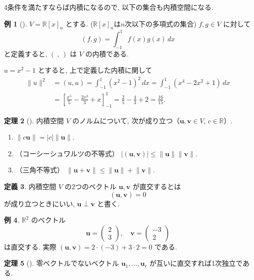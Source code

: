 \documentclass[dvipdfmx,a4paper,11pt]{article} %
\theoremstyle{definition}
\newtheorem{thm}{定理}[section]
\newtheorem{defn}[thm]{定義}
\newtheorem{eg}[thm]{例}
\newtheorem{ex}[thm]{例}
\begin{document}
4条件を満たすならば内積になるので, 以下の集合も内積空間になる. 
\begin{eg}
[{\cite[例題6.1.2]{M}}]
$V=\mathbb{R}[x]_n$ とする. ($\mathbb{R}[x]_n$は$n$次以下の多項式の集合)
$f,g\in V$ に対して
\[
(f,g)=\int_{-1}^{1}f(x)g(x)\,dx
\]
と定義すると, $(\ ,\ )$ は $V$ の内積である.

\(
u=
x^2 -1
\)
とすると, 上で定義した内積に関して
\begin{align*}
\lVert u\rVert^2
&=(u,u)
=\int_{-1}^{1}(x^2-1)^2\,dx
=\int_{-1}^{1}(x^4-2x^2+1)\,dx
\\
&=\left[
\frac{x^5}{5}-\frac{2x^3}{3}+x
\right]_{-1}^{1}
=\frac{2}{5}-\frac{4}{3}+2=\frac{16}{15}.
\end{align*}
\end{eg}




\begin{thm}
[{\cite[定理6.1.1]{M}}]
内積空間 $V$ のノルムについて, 次が成り立つ（$\bm{u},\bm{v}\in V$, $c\in\mathbb{R}$）.
\begin{enumerate}
\item$\lVert c\bm{u}\rVert=\lvert c\rvert\lVert \bm{u}\rVert$.
\item （コーシーシュワルツの不等式） $\lvert(\bm{u},\bm{v})\rvert\leq\lVert \bm{u}\rVert\lVert \bm{v}\rVert$.
\item （三角不等式） $\lVert \bm{u}+\bm{v}\rVert\leq\lVert \bm{u}\rVert+\lVert \bm{v}\rVert$.
\end{enumerate}
\end{thm}


\begin{defn}
内積空間 $V$ の2つのベクトル $\bm{u},\bm{v}$ が直交するとは
\[
(\bm{u},\bm{v})=0
\]
が成り立つときにいい, $\bm{u}\perp \bm{v}$ と書く.
\end{defn}


\begin{ex}
$\mathbb{R}^2$ のベクトル
\[
\bm{u}=
\begin{pmatrix}
2\\
3
\end{pmatrix},
\quad
\bm{v}=
\begin{pmatrix}
-3\\
2
\end{pmatrix}
\]
は直交する. 実際
\(
(\bm{u},\bm{v})=2\cdot(-3)+3\cdot2=0
\)
である.
\end{ex}

\begin{thm}
[{\cite[定理6.1.2]{M}}]
\label{thm-M-6.1.2}
零ベクトルでないベクトル $\bm{u}_1,\ldots,\bm{u}_r$ が互いに直交すれば1次独立である.
\end{thm}
\end{document}
